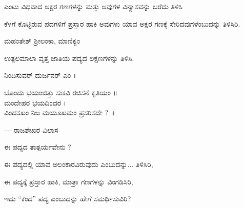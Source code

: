 \vspace{2.5pt plus 3pt minus 0.5pt}\noindent\hspace*{1.2em}\hspace{0.55em}ಎಂಟು ವಿಧವಾದ ಅಕ್ಷರ ಗಣಗಳನ್ನು ಮತ್ತು ಅವುಗಳ ವಿನ್ಯಾಸವನ್ನು ಬರೆದು ತಿಳಿಸಿ\par

\vspace{2.5pt plus 3pt minus 0.5pt}\noindent\hspace*{1.2em}\hspace{0.55em}ಕೆಳಗೆ ಕೊಟ್ಟಿರುವ ಪದಗಳಿಗೆ ಪ್ರಸ್ತಾರ ಹಾಕಿ ಅವುಗಳು ಯಾವ ಅಕ್ಷರ ಗಣಕ್ಕೆ ಸೇರಿದವುಗಳೆಂಬುದನ್ನು ತಿಳಿಸಿರಿ.\par


\indent ಮಹಂತೇಶ್‌ ಶ್ರೀಲಂಕಾ, ಮಾಣಿಕ್ಯಂ\par

\vspace{2.5pt plus 3pt minus 0.5pt}\noindent\hspace*{1.2em}\hspace{0.55em}ಉತ್ಪಲಮಾಲಾ ವೃತ್ತ ಜಾತಿಯ ಪದ್ಯದ ಲಕ್ಷಣಗಳನ್ನು ತಿಳಿಸಿ.\par

\vspace{2.5pt plus 3pt minus 0.5pt}\noindent\hspace*{1.2em}\hspace{0.55em}ನಿಂದಿಸುವರ್‌ ದುರ್ಜನರ್‌ ಎಂ ।\par

\begin{kbvverse}
\noindent ಬೊಂದು ಭಯಂಜಿತ್ತು ಸುಕವಿ ರಚಿಸನೆ ಕೃತಿಯಂ ॥ \\
\noindent ಮಂದೇಹರ ಭಯದಿಂದರ । \\
\noindent ವಿಂದಸಖಂ ನಿಜ ಮಯೂಖಮಂ ಪ್ರಸರಿಸದೇ ? ॥
\end{kbvverse}

\noindent\hfill{\fontsize{9.5pt}{12.5pt}\selectfont\color{kbvgrey}— ರಾಜಶೇಖರ ವಿಲಾಸ}\par\vspace{3pt plus 2pt}

\vspace{2.5pt plus 3pt minus 0.5pt}\noindent\hspace*{1.2em}\hspace{0.55em}ಈ ಪದ್ಯದ ತಾತ್ಪರ್ಯವೇನು ?\par

\vspace{2.5pt plus 3pt minus 0.5pt}\noindent\hspace*{1.2em}\hspace{0.55em}ಈ ಪದ್ಯದಲ್ಲಿ ಯಾವ ಅಲಂಕಾರವಿರುವುದು ಎಂಬುದನ್ನು... ತಿಳಿಸಿರಿ,\par

\vspace{2.5pt plus 3pt minus 0.5pt}\noindent\hspace*{1.2em}\hspace{0.55em}ಈ ಪದ್ಯಕ್ಕೆ ಪ್ರಸ್ತಾರ ಹಾಕಿ, ಮಾತ್ರಾ ಗಣಗಳನ್ನು ವಿಂಗಡಿಸಿರಿ,\par

\vspace{2.5pt plus 3pt minus 0.5pt}\noindent\hspace*{1.2em}\hspace{0.55em}ಇದು “ಕಂದ” ಪದ್ಯ ಎಂಬುದನ್ನು ಹೇಗೆ ಸಮರ್ಥಿಸುವಿರಿ?\par
